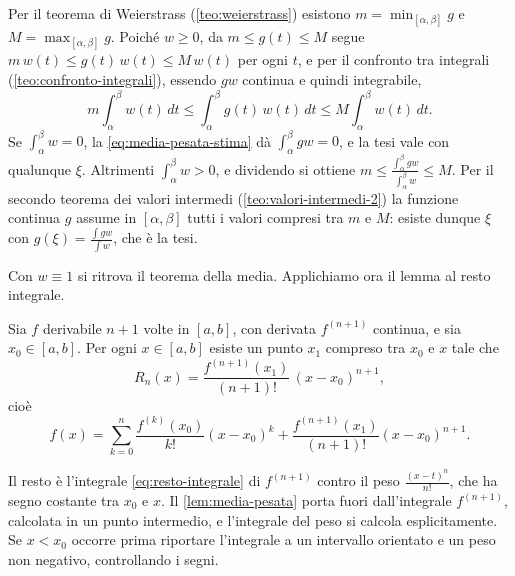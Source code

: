 \begin{dimostrazione}
Per il teorema di Weierstrass (\cref{teo:weierstrass}) esistono
$m=\min_{[\alpha,\beta]}g$ e $M=\max_{[\alpha,\beta]}g$. Poiché $w\ge0$, da $m\le g(t)\le M$ segue
$m\,w(t)\le g(t)\,w(t)\le M\,w(t)$ per ogni $t$, e per il confronto tra integrali
(\cref{teo:confronto-integrali}), essendo $gw$ continua e quindi integrabile,
\begin{equation}\label{eq:media-pesata-stima}
  m\int_{\alpha}^{\beta}w(t)\,dt\le\int_{\alpha}^{\beta}g(t)\,w(t)\,dt\le M\int_{\alpha}^{\beta}w(t)\,dt .
\end{equation}
Se $\int_{\alpha}^{\beta}w=0$, la \eqref{eq:media-pesata-stima} dà $\int_{\alpha}^{\beta}gw=0$, e la tesi vale con
qualunque $\xi$. Altrimenti $\int_{\alpha}^{\beta}w>0$, e dividendo si ottiene
$m\le\frac{\int_{\alpha}^{\beta}gw}{\int_{\alpha}^{\beta}w}\le M$. Per il secondo teorema dei valori intermedi
(\cref{teo:valori-intermedi-2}) la funzione continua $g$ assume in $[\alpha,\beta]$ tutti i valori
compresi tra $m$ e $M$: esiste dunque $\xi$ con $g(\xi)=\frac{\int gw}{\int w}$, che è la tesi.
\end{dimostrazione}

Con $w\equiv1$ si ritrova il teorema della media. Applichiamo ora il lemma al resto
integrale.

\begin{teorema}\label{teo:resto-lagrange}
Sia $f$ derivabile $n+1$ volte in $[a,b]$, con derivata $f^{(n+1)}$ continua, e sia
$x_{0}\in[a,b]$. Per ogni $x\in[a,b]$ esiste un punto $x_{1}$ compreso tra $x_{0}$ e $x$ tale che
\begin{equation}\label{eq:resto-lagrange}
  R_{n}(x)=\frac{f^{(n+1)}(x_{1})}{(n+1)!}\,(x-x_{0})^{n+1} ,
\end{equation}
cioè
\[
  f(x)=\sum_{k=0}^{n}\frac{f^{(k)}(x_{0})}{k!}(x-x_{0})^{k}+\frac{f^{(n+1)}(x_{1})}{(n+1)!}(x-x_{0})^{n+1} .
\]
\end{teorema}

\begin{schema}
\end{schema}

\begin{strategia}
Il resto è l'integrale \eqref{eq:resto-integrale} di $f^{(n+1)}$ contro il peso
$\frac{(x-t)^{n}}{n!}$, che ha segno costante tra $x_{0}$ e $x$. Il \cref{lem:media-pesata} porta
fuori dall'integrale $f^{(n+1)}$, calcolata in un punto intermedio, e l'integrale del peso
si calcola esplicitamente. Se $x<x_{0}$ occorre prima riportare l'integrale a un intervallo
orientato e un peso non negativo, controllando i segni.
\end{strategia}

